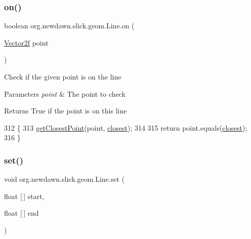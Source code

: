 \subsubsection{\texorpdfstring{on()}{on()}}
{\footnotesize\ttfamily boolean org.\+newdawn.\+slick.\+geom.\+Line.\+on (\begin{DoxyParamCaption}\item[{\mbox{\hyperlink{classorg_1_1newdawn_1_1slick_1_1geom_1_1_vector2f}{Vector2f}}}]{point }\end{DoxyParamCaption})\hspace{0.3cm}{\ttfamily [inline]}}

Check if the given point is on the line


\begin{DoxyParams}{Parameters}
{\em point} & The point to check \\
\hline
\end{DoxyParams}
\begin{DoxyReturn}{Returns}
True if the point is on this line 
\end{DoxyReturn}

\begin{DoxyCode}
312                                       \{
313         \mbox{\hyperlink{classorg_1_1newdawn_1_1slick_1_1geom_1_1_line_ae555b65b604e0bed3e650ab156375a99}{getClosestPoint}}(point, \mbox{\hyperlink{classorg_1_1newdawn_1_1slick_1_1geom_1_1_line_a9ca28ca6a3b18057161bf8cd4c5f2a36}{closest}});
314 
315         \textcolor{keywordflow}{return} point.equals(\mbox{\hyperlink{classorg_1_1newdawn_1_1slick_1_1geom_1_1_line_a9ca28ca6a3b18057161bf8cd4c5f2a36}{closest}});
316     \}
\end{DoxyCode}
\mbox{\label{classorg_1_1newdawn_1_1slick_1_1geom_1_1_line_a4cf466f0b4caf590a9115a3f42f7065d}} 
\subsubsection{\texorpdfstring{set()}{set()}\hspace{0.1cm}{\footnotesize\ttfamily [1/3]}}
{\footnotesize\ttfamily void org.\+newdawn.\+slick.\+geom.\+Line.\+set (\begin{DoxyParamCaption}\item[{float \mbox{[}$\,$\mbox{]}}]{start,  }\item[{float \mbox{[}$\,$\mbox{]}}]{end }\end{DoxyParamCaption})\hspace{0.3cm}{\ttfamily [inline]}}

